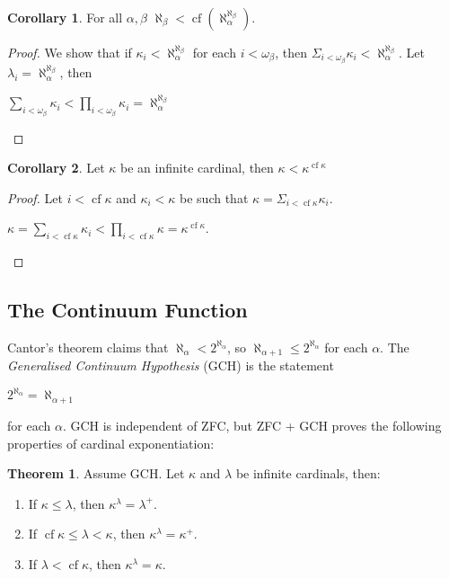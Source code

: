 \documentclass[8pt]{article}
\theoremstyle{definition}
\theoremstyle{definition}
\newtheorem{theorem}{Theorem}[section]
\theoremstyle{definition}
\theoremstyle{definition}
\theoremstyle{definition}
\theoremstyle{definition}
\theoremstyle{definition}
\theoremstyle{definition}
\theoremstyle{definition}
\theoremstyle{definition}
\theoremstyle{definition}
\theoremstyle{definition}
\theoremstyle{definition}
\theoremstyle{definition}
\newtheorem{col}{Corollary}[section]
\theoremstyle{question}
\begin{document}
\begin{col}
  For all $\alpha, \beta$ $\aleph_{\beta} < \operatorname{cf}(\aleph_{\alpha}^{\aleph_{\beta}})$.
\end{col}

\begin{proof}
  We show that if $\kappa_i < \aleph_{\alpha}^{\aleph_{\beta}}$ for each 
  $i < \omega_{\beta}$, then $\Sigma_{i < \omega_{\beta}} \kappa_i < \aleph_{\alpha}^{\aleph_{\beta}}$.
  Let $\lambda_i = \aleph_{\alpha}^{\aleph_{\beta}}$, then
  \begin{center}
    $\sum \limits_{i < \omega_{\beta}} \kappa_i < \prod \limits_{i < \omega_{\beta}} \kappa_i = \aleph_{\alpha}^{\aleph_{\beta}}$
  \end{center}
\end{proof}

\begin{col}
  Let $\kappa$ be an infinite cardinal, then $\kappa < \kappa^{\operatorname{cf} \kappa}$
\end{col}

\begin{proof}
  Let $i < \operatorname{cf} \kappa$ and $\kappa_i < \kappa$ be such that $\kappa = \Sigma_{i < \operatorname{cf} \kappa} \kappa_i$.
  \begin{center}
    $\kappa = \sum \limits_{i < \operatorname{cf} \kappa} \kappa_i < \prod \limits_{i < \operatorname{cf} \kappa} \kappa = \kappa^{\operatorname{cf} \kappa}$.
  \end{center}
\end{proof}

\subsection{The Continuum Function}

Cantor's theorem claims that $\aleph_{\alpha} < 2^{\aleph_{\alpha}}$, so $\aleph_{\alpha+1} \leq 2^{\aleph_{\alpha}}$
for each $\alpha$. The \emph{Generalised Continuum Hypothesis} (GCH) is the statement
\begin{center}
  $2^{\aleph_{\alpha}} = \aleph_{\alpha+1}$
\end{center}
for each $\alpha$. GCH is independent of ZFC, but ZFC + GCH proves the following properties of
cardinal exponentiation:
\begin{theorem} Assume GCH. Let $\kappa$ and $\lambda$ be infinite cardinals, then:

  \begin{enumerate}
    \item If $\kappa \leq \lambda$, then $\kappa^{\lambda} = \lambda^{+}$.
    \item If $\operatorname{cf} \kappa \leq \lambda < \kappa$, then $\kappa^{\lambda} = \kappa^{+}$.
    \item If $\lambda < \operatorname{cf} \kappa$, then $\kappa^{\lambda} = \kappa$.
  \end{enumerate}
\end{theorem}
\end{document}
